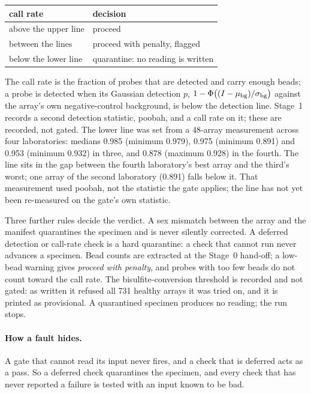 \begin{center}\small
\begin{tabular}{@{}ll@{}}\toprule
call rate & decision \\\midrule
above the upper line & proceed \\
between the lines & proceed with penalty, flagged \\
below the lower line & quarantine: no reading is written \\\bottomrule
\end{tabular}
\end{center}
The call rate is the fraction of probes that are detected and carry enough beads; a probe is detected when its Gaussian detection $p$,
$1-\Phi\big((I-\mu_{\rm bg})/\sigma_{\rm bg}\big)$ against the array's own negative-control background, is below the detection line.
Stage~1 records a second detection statistic, poobah, and a call rate on it; these are recorded, not
gated. The lower line was set from a 48-array measurement across four laboratories: medians 0.985 (minimum 0.979), 0.975 (minimum 0.891) and 0.953
(minimum 0.932) in three, and 0.878 (maximum 0.928) in the fourth. \measured{} The line
sits in the gap between the fourth laboratory's best array and the third's worst; one array of the second laboratory
(0.891) falls below it. That measurement used poobah, not the statistic the gate applies; the line has not yet been
re-measured on the gate's own statistic. \openprob

Three further rules decide the verdict. A sex mismatch between the array and the manifest quarantines the specimen and is never silently
corrected. A deferred detection or call-rate check is a hard quarantine: a check that cannot run never advances a specimen.
Bead counts are extracted at the Stage~0 hand-off; a low-bead warning gives \emph{proceed with penalty}, and probes with too few
beads do not count toward the call rate. The bisulfite-conversion threshold is recorded and not gated: as written it refused all 731 healthy
arrays it was tried on, and it is printed as provisional. \openprob{} A quarantined
specimen produces no reading; the run stops.

\paragraph{How a fault hides.} A gate that cannot read its input never fires, and a check that is deferred acts as a pass. So a deferred
check quarantines the specimen, and every check that has never reported a failure is tested with an input known to be bad.

